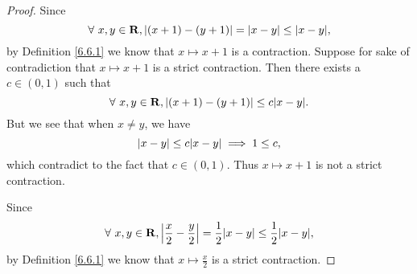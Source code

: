 \begin{proof}
    Since
    \[
        \forall\ x, y \in \mathbf{R}, \abs*{(x + 1) - (y + 1)} = \abs*{x - y} \leq \abs*{x - y},
    \]
    by Definition \ref{6.6.1} we know that \(x \mapsto x + 1\) is a contraction.
    Suppose for sake of contradiction that \(x \mapsto x + 1\) is a strict contraction.
    Then there exists a \(c \in (0, 1)\) such that
    \[
        \forall\ x, y \in \mathbf{R}, \abs*{(x + 1) - (y + 1)} \leq c \abs*{x - y}.
    \]
    But we see that when \(x \neq y\), we have
    \[
        \abs*{x - y} \leq c \abs*{x - y} \implies 1 \leq c,
    \]
    which contradict to the fact that \(c \in (0, 1)\).
    Thus \(x \mapsto x + 1\) is not a strict contraction.

    Since
    \[
        \forall\ x, y \in \mathbf{R}, \abs*{\frac{x}{2} - \frac{y}{2}} = \frac{1}{2} \abs*{x - y} \leq \frac{1}{2} \abs*{x - y},
    \]
    by Definition \ref{6.6.1} we know that \(x \mapsto \frac{x}{2}\) is a strict contraction.


\end{proof}
